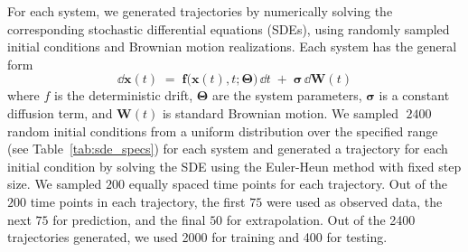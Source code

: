 \documentclass[a4paper,10pt,twocolumn,preprint,3p]{elsarticle}
\begin{document}
For each system, we generated trajectories by numerically solving the corresponding stochastic differential equations (SDEs), using randomly sampled initial conditions and Brownian motion realizations.
Each system has the general form
$$
  \dd \mathbf{x}(t) \;=\; \mathbf{f}\bigl(\mathbf{x}(t),t;\boldsymbol{\Theta}\bigr)\,\dd t 
  \;+\; \boldsymbol{\sigma}\,\dd \mathbf{W}(t)
$$
where \(f\) is the deterministic drift, \(\boldsymbol{\Theta}\) are the system parameters, \(\boldsymbol{\sigma}\) is a constant diffusion term, and \(\mathbf{W}(t)\) is standard Brownian motion.
We sampled \(\;2400\) random initial conditions from a uniform distribution over the specified range (see Table~\ref{tab:sde_specs}) for each system and generated a trajectory for each initial condition by solving the SDE using the Euler-Heun method with fixed step size.  We sampled \(200\) equally spaced time points for each trajectory. Out of the \(200\) time points in each trajectory, the first \(75\) were used as observed data, the next \(75\) for prediction, and the final \(50\) for extrapolation. Out of the 2400 trajectories generated, we used 2000 for training and 400 for testing. 
\end{document}
